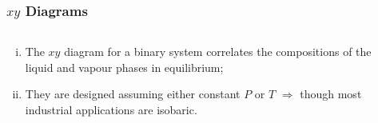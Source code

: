 \documentclass[10pt,compress,unknownkeysallowed]{beamer}
\begin{document}
\begin{frame}
  \frametitle{$xy$ Diagrams}
  \begin{columns}
     \begin{column}[l]{0.4\linewidth}
       \begin{enumerate}[i)]
          \item<1-> The $xy$ diagram for a binary system correlates the compositions of the liquid and vapour phases in equilibrium;
          \item<1-> They are designed assuming either constant $P$ or $T$ $\Longrightarrow$ though most industrial applications are isobaric.
       \end{enumerate}
     \end{column}
     \begin{column}[l]{0.6\linewidth}
     \end{column}
  \end{columns}
\end{frame}
\normalsize
\end{document}
